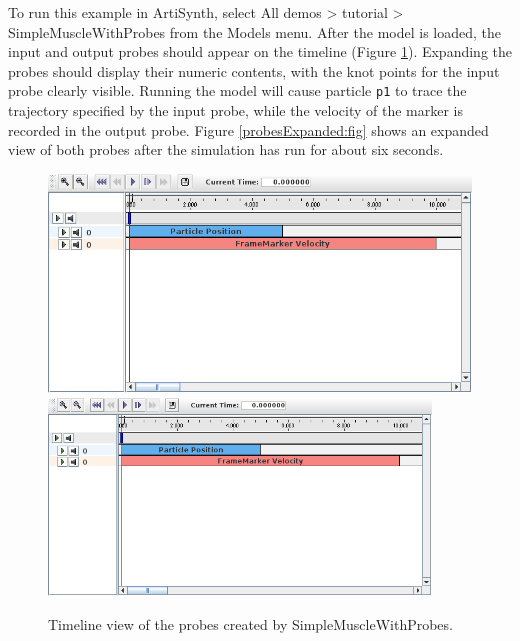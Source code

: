 To run this example in ArtiSynth, select {\sf All demos > tutorial >
SimpleMuscleWithProbes} from the {\sf Models} menu. After the model is
loaded, the input and output probes should appear on the timeline
(Figure \ref{probes:fig}). Expanding the probes should display their
numeric contents, with the knot points for the input probe clearly
visible.  Running the model will cause particle {\tt p1} to trace the
trajectory specified by the input probe, while the velocity of the
marker is recorded in the output probe. Figure
\ref{probesExpanded:fig} shows an expanded view of both probes after
the simulation has run for about six seconds.


\begin{figure}[ht]
\begin{center}
\iflatexml
 \includegraphics[]{images/timelineProbes}
\else
 \includegraphics[width=4in]{images/timelineProbes}
\fi
\end{center}
\caption{Timeline view of the probes created by SimpleMuscleWithProbes.}
\label{probes:fig}
\end{figure}

